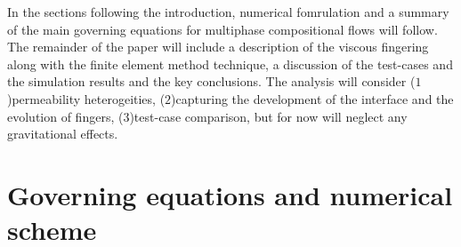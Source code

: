 \documentclass[preprint,authoryear,12pt]{elsarticle}
\begin{document}
\medskip
In the sections following the introduction, numerical fomrulation and a summary of the main governing equations for multiphase compositional flows will follow. The remainder of the paper will include a description of the viscous fingering along with the finite element method technique, a discussion of the test-cases and the simulation results and the key conclusions. The analysis will consider ($1$)permeability heterogeities, ($2$)capturing the development of the interface and the evolution of fingers, ($3$)test-case comparison, but for now will neglect any gravitational effects.


\section{Governing equations and numerical scheme}\label{equations_scheme}      
\end{document}
